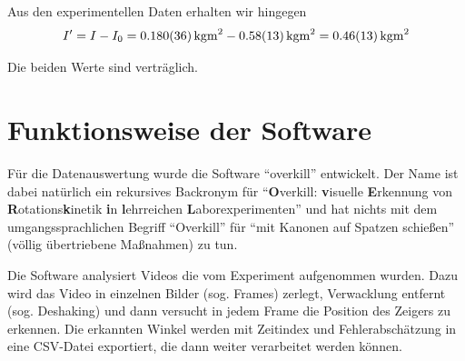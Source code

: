 \documentclass[a4paper,german,12pt,smallheadings]{scrartcl}
\begin{document}
Aus den experimentellen Daten erhalten wir hingegen
\begin{equation}
  I' = I - I_0 = \SI{0.180+-0.036}{kg m^2} - \SI{0.58+-0.13}{kg m^2} = \SI{0.46+-0.13}{kg m^2}
\end{equation}

Die beiden Werte sind verträglich.

\section{Funktionsweise der Software}
Für die Datenauswertung wurde die Software ``overkill'' entwickelt. Der Name
ist dabei natürlich ein rekursives Backronym für ``\textbf{O}verkill:
\textbf{v}isuelle \textbf{E}rkennung von \textbf{R}otations\textbf{k}inetik
\textbf{i}n \textbf{l}ehrreichen \textbf{L}aborexperimenten'' und hat nichts mit dem
umgangssprachlichen Begriff ``Overkill'' für ``mit Kanonen auf Spatzen
schießen'' (völlig übertriebene Maßnahmen) zu tun.

Die Software analysiert Videos die vom Experiment aufgenommen wurden. Dazu wird
das Video in einzelnen Bilder (sog. Frames) zerlegt, Verwacklung entfernt (sog.
Deshaking) und dann versucht in jedem Frame die Position des Zeigers zu
erkennen. Die erkannten Winkel werden mit Zeitindex und Fehlerabschätzung in
eine CSV-Datei exportiert, die dann weiter verarbeitet werden können.
\end{document}
